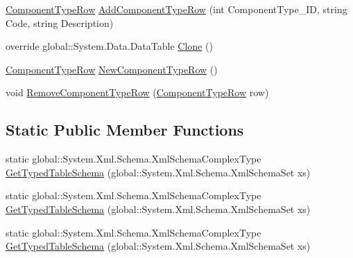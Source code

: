 \begin{DoxyCompactItemize}
\item 
\hyperlink{class_env_int_1_1_win32_1_1_field_tech_1_1_manager_1_1_data_sets_1_1_guide_ware_mobile_data_set_1_1_component_type_row}{Component\+Type\+Row} \hyperlink{class_env_int_1_1_win32_1_1_field_tech_1_1_manager_1_1_data_sets_1_1_guide_ware_mobile_data_set_1_1_component_type_data_table_af9070dd91abe3423f1e0a03e14a335b4}{Add\+Component\+Type\+Row} (int Component\+Type\+\_\+\+I\+D, string Code, string Description)
\item 
override global\+::\+System.\+Data.\+Data\+Table \hyperlink{class_env_int_1_1_win32_1_1_field_tech_1_1_manager_1_1_data_sets_1_1_guide_ware_mobile_data_set_1_1_component_type_data_table_aee715d9b4b39977a3479231c4c5e7896}{Clone} ()
\item 
\hyperlink{class_env_int_1_1_win32_1_1_field_tech_1_1_manager_1_1_data_sets_1_1_guide_ware_mobile_data_set_1_1_component_type_row}{Component\+Type\+Row} \hyperlink{class_env_int_1_1_win32_1_1_field_tech_1_1_manager_1_1_data_sets_1_1_guide_ware_mobile_data_set_1_1_component_type_data_table_a0385abfa9e46a887f223d0a90205e450}{New\+Component\+Type\+Row} ()
\item 
void \hyperlink{class_env_int_1_1_win32_1_1_field_tech_1_1_manager_1_1_data_sets_1_1_guide_ware_mobile_data_set_1_1_component_type_data_table_a7b93e932720c53787be4833406918284}{Remove\+Component\+Type\+Row} (\hyperlink{class_env_int_1_1_win32_1_1_field_tech_1_1_manager_1_1_data_sets_1_1_guide_ware_mobile_data_set_1_1_component_type_row}{Component\+Type\+Row} row)
\end{DoxyCompactItemize}
\subsection*{Static Public Member Functions}
\begin{DoxyCompactItemize}
\item 
static global\+::\+System.\+Xml.\+Schema.\+Xml\+Schema\+Complex\+Type \hyperlink{class_env_int_1_1_win32_1_1_field_tech_1_1_manager_1_1_data_sets_1_1_guide_ware_mobile_data_set_1_1_component_type_data_table_a9e5d9a0c0a7a6c46d7196dfb2ac47f4e}{Get\+Typed\+Table\+Schema} (global\+::\+System.\+Xml.\+Schema.\+Xml\+Schema\+Set xs)
\item 
static global\+::\+System.\+Xml.\+Schema.\+Xml\+Schema\+Complex\+Type \hyperlink{class_env_int_1_1_win32_1_1_field_tech_1_1_manager_1_1_data_sets_1_1_guide_ware_mobile_data_set_1_1_component_type_data_table_a9e5d9a0c0a7a6c46d7196dfb2ac47f4e}{Get\+Typed\+Table\+Schema} (global\+::\+System.\+Xml.\+Schema.\+Xml\+Schema\+Set xs)
\item 
static global\+::\+System.\+Xml.\+Schema.\+Xml\+Schema\+Complex\+Type \hyperlink{class_env_int_1_1_win32_1_1_field_tech_1_1_manager_1_1_data_sets_1_1_guide_ware_mobile_data_set_1_1_component_type_data_table_a9e5d9a0c0a7a6c46d7196dfb2ac47f4e}{Get\+Typed\+Table\+Schema} (global\+::\+System.\+Xml.\+Schema.\+Xml\+Schema\+Set xs)
\end{DoxyCompactItemize}
